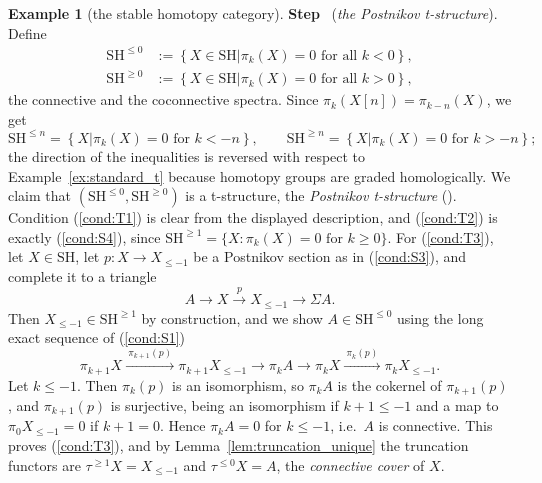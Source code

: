 \documentclass[12pt]{amsart}
\newcommand{\condref}[1]{\textup{(\ref{#1})}}
\numberwithin{theorem}{section}
\theoremstyle{definition}
\newtheorem{example}[theorem]{Example}
\newcounter{pstep}
\newcommand{\step}[1]{\par\medskip\noindent\refstepcounter{pstep}\textbf{Step \thepstep}\ (\textit{#1}).\ \ignorespaces}
\newcommand{\SH}{\mathrm{SH}}
\newcommand{\defineset}[2]{\left\{
	\left.
	#1
	\right\vert
	#2
	\right\}}
\begin{document}
\begin{example}[the stable homotopy category]
		\step{the Postnikov t-structure}
		Define
		\begin{align*}
			\SH^{\leqslant 0} &:= \defineset{ X \in \SH }{ \pi_k(X) = 0 \text{ for all } k < 0 }, \\
			\SH^{\geqslant 0} &:= \defineset{ X \in \SH }{ \pi_k(X) = 0 \text{ for all } k > 0 },
		\end{align*}
		the connective and the coconnective spectra.
		Since $\pi_k(X[n]) = \pi_{k-n}(X)$, we get
		\[
		\SH^{\leqslant n} = \defineset{ X }{ \pi_k(X) = 0 \text{ for } k < -n },
		\qquad
		\SH^{\geqslant n} = \defineset{ X }{ \pi_k(X) = 0 \text{ for } k > -n } ;
		\]
		the direction of the inequalities is reversed with respect to Example~\ref{ex:standard_t} because homotopy groups are graded homologically.
		We claim that $(\SH^{\leqslant 0}, \SH^{\geqslant 0})$ is a t-structure, the \emph{Postnikov t-structure} (\cite[Prop.~1.4.3.6]{Lur17}).
		Condition \condref{cond:T1} is clear from the displayed description, and \condref{cond:T2} is exactly \condref{cond:S4}, since $\SH^{\geqslant 1} = \{ X : \pi_k(X) = 0 \text{ for } k \geqslant 0 \}$.
		For \condref{cond:T3}, let $X \in \SH$, let $p \colon X \to X_{\leqslant -1}$ be a Postnikov section as in \condref{cond:S3}, and complete it to a triangle
		\[
		A \longrightarrow X \xrightarrow{\ p\ } X_{\leqslant -1} \longrightarrow \Sigma A .
		\]
		Then $X_{\leqslant -1} \in \SH^{\geqslant 1}$ by construction, and we show $A \in \SH^{\leqslant 0}$ using the long exact sequence of \condref{cond:S1}
		\[
		\pi_{k+1} X \xrightarrow{\ \pi_{k+1}(p)\ } \pi_{k+1} X_{\leqslant -1} \longrightarrow \pi_k A \longrightarrow \pi_k X \xrightarrow{\ \pi_k(p)\ } \pi_k X_{\leqslant -1} .
		\]
		Let $k \leqslant -1$.
		Then $\pi_k(p)$ is an isomorphism, so $\pi_k A$ is the cokernel of $\pi_{k+1}(p)$, and $\pi_{k+1}(p)$ is surjective, being an isomorphism if $k + 1 \leqslant -1$ and a map to $\pi_0 X_{\leqslant -1} = 0$ if $k + 1 = 0$.
		Hence $\pi_k A = 0$ for $k \leqslant -1$, i.e.\ $A$ is connective.
		This proves \condref{cond:T3}, and by Lemma~\ref{lem:truncation_unique} the truncation functors are $\tau^{\geqslant 1} X = X_{\leqslant -1}$ and $\tau^{\leqslant 0} X = A$, the \emph{connective cover} of $X$.
		

\end{example}
\end{document}
